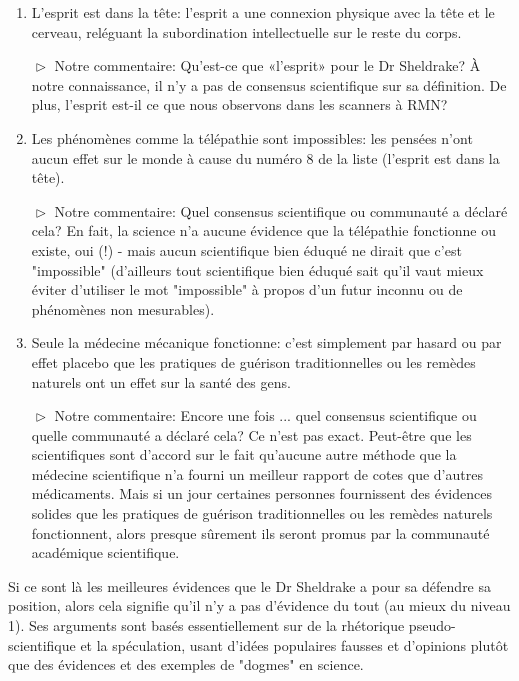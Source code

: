 \begin{enumerate}
		\item \og L'esprit est dans la tête: l'esprit a une connexion physique avec la tête et le cerveau, reléguant la subordination intellectuelle sur le reste du corps.\fg{}
		
		$\vartriangleright$ Notre commentaire: Qu'est-ce que «l'esprit» pour le Dr Sheldrake? À notre connaissance, il n'y a pas de consensus scientifique sur sa définition. De plus, l'esprit est-il ce que nous observons dans les scanners à RMN?

		\item \og Les phénomènes comme la télépathie sont impossibles: les pensées n'ont aucun effet sur le monde à cause du numéro 8 de la liste (l'esprit est dans la tête). \fg{}
		
		$\vartriangleright$ Notre commentaire: Quel consensus scientifique ou communauté a déclaré cela? En fait, la science n'a aucune évidence que la télépathie fonctionne ou existe, oui (!) - mais aucun scientifique bien éduqué ne dirait que c'est "impossible" (d'ailleurs tout scientifique bien éduqué sait qu'il vaut mieux éviter d'utiliser le mot "impossible" à propos d'un futur inconnu ou de phénomènes non mesurables).

		\item \og Seule la médecine mécanique fonctionne: c’est simplement par hasard ou par effet placebo que les pratiques de guérison traditionnelles ou les remèdes naturels ont un effet sur la santé des gens. \fg{}
		
		$\vartriangleright$ Notre commentaire: Encore une fois ... quel consensus scientifique ou quelle communauté a déclaré cela? Ce n'est pas exact. Peut-être que les scientifiques sont d'accord sur le fait qu'aucune autre méthode que la médecine scientifique n'a fourni un meilleur rapport de cotes que d'autres médicaments. Mais si un jour certaines personnes fournissent des évidences solides que les pratiques de guérison traditionnelles ou les remèdes naturels fonctionnent, alors presque sûrement ils seront promus par la communauté académique scientifique.
	\end{enumerate}
	
	Si ce sont là les meilleures évidences que le Dr Sheldrake a pour sa défendre sa position, alors cela signifie qu'il n'y a pas d'évidence du tout (au mieux du niveau 1). Ses arguments sont basés essentiellement sur de la rhétorique pseudo-scientifique et la spéculation, usant d'idées populaires fausses et d'opinions plutôt que des évidences et des exemples de "dogmes" en science.

